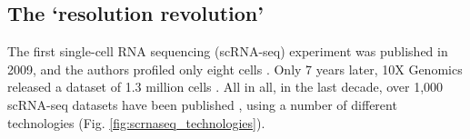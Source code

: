 
 






\subsection{The `resolution revolution'}
\label{sec:scrnaseq}

The first single-cell RNA sequencing (scRNA-seq) experiment was published in 2009, and the authors profiled only eight cells \cite{tang2009mrna}. 
Only 7 years later, 10X Genomics released a dataset of 
1.3 million cells \cite{102016our}.
All in all, in the last decade, over 1,000 scRNA-seq datasets have been published 
\cite{svensson2018exponential, svensson2019curated, svensson2020single},
using a number of different technologies 
\cite{islam2011characterization, hashimshony2012cel, ramskold2012full, picelli2013smart, sasagawa2013quartz, jaitin2014massively, macosko2015highly,klein2015droplet, gierahn2017seq, zheng2017massively, hagemann2020single}
(Fig. \ref{fig:scrnaseq_technologies}). \\

